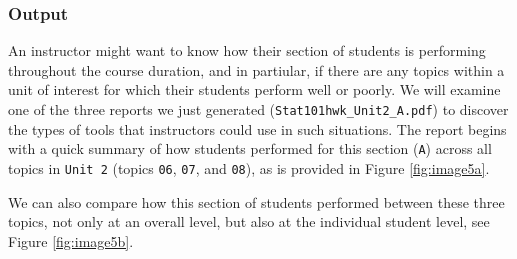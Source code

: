 \documentclass{article}\usepackage[]{graphicx}\usepackage[]{color}
\numberwithin{equation}{section} %
\begin{document}
\subsubsection{Output}

An instructor might want to know how their section of students is performing throughout the course duration, and in partiular, if there are any topics within a unit of interest for which their students perform well or poorly. We will examine one of the three reports we just generated (\texttt{Stat101hwk\_Unit2\_A.pdf}) to discover the types of tools that instructors could use in such situations. The report begins with a quick summary of how students performed for this section (\texttt{A}) across all topics in \texttt{Unit 2} (topics \texttt{06}, \texttt{07}, and \texttt{08}), as is provided in Figure \ref{fig:image5a}.

\begin{center}
\captionsetup{width=0.65\textwidth}
\label{fig:image5a}
\end{center}

We can also compare how this section of students performed between these three topics, not only at an overall level, but also at the individual student level, see Figure \ref{fig:image5b}.

\begin{center}
\captionsetup{width=0.65\textwidth}
\label{fig:image5b}
\end{center}
\end{document}
